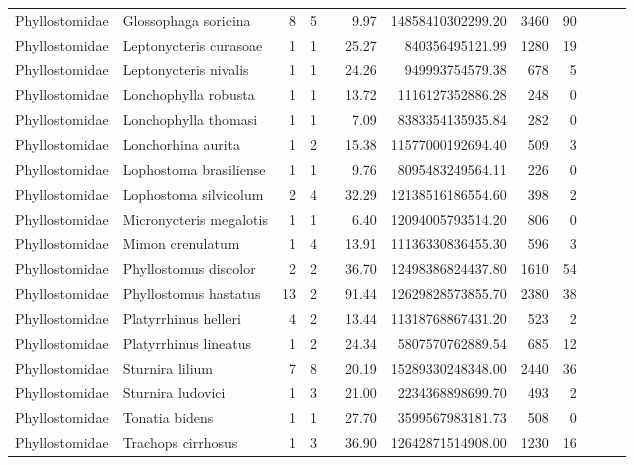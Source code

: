 \begin{landscape}
\begin{longtable}{@{}llrrrrrrrrrr@{}}
  Phyllostomidae & Glossophaga soricina &   8 &   5 &  & 9.97 & 14858410302299.20 & 3460 &  90 &  &  &  \\ 
  Phyllostomidae & Leptonycteris curasoae &   1 &   1 &  & 25.27 & 840356495121.99 & 1280 &  19 &  &  &  \\ 
  Phyllostomidae & Leptonycteris nivalis &   1 &   1 &  & 24.26 & 949993754579.38 & 678 &   5 &  &  &  \\ 
  Phyllostomidae & Lonchophylla robusta &   1 &   1 &  & 13.72 & 1116127352886.28 & 248 &   0 &  &  &  \\ 
  Phyllostomidae & Lonchophylla thomasi &   1 &   1 &  & 7.09 & 8383354135935.84 & 282 &   0 &  &  &  \\ 
  Phyllostomidae & Lonchorhina aurita &   1 &   2 &  & 15.38 & 11577000192694.40 & 509 &   3 &  &  &  \\ 
  Phyllostomidae & Lophostoma brasiliense &   1 &   1 &  & 9.76 & 8095483249564.11 & 226 &   0 &  &  &  \\ 
  Phyllostomidae & Lophostoma silvicolum &   2 &   4 &  & 32.29 & 12138516186554.60 & 398 &   2 &  &  &  \\ 
  Phyllostomidae & Micronycteris megalotis &   1 &   1 &  & 6.40 & 12094005793514.20 & 806 &   0 &  &  &  \\ 
  Phyllostomidae & Mimon crenulatum &   1 &   4 &  & 13.91 & 11136330836455.30 & 596 &   3 &  &  &  \\ 
  Phyllostomidae & Phyllostomus discolor &   2 &   2 &  & 36.70 & 12498386824437.80 & 1610 &  54 &  &  &  \\ 
  Phyllostomidae & Phyllostomus hastatus &  13 &   2 &  & 91.44 & 12629828573855.70 & 2380 &  38 &  &  &  \\ 
  Phyllostomidae & Platyrrhinus helleri &   4 &   2 &  & 13.44 & 11318768867431.20 & 523 &   2 &  &  &  \\ 
  Phyllostomidae & Platyrrhinus lineatus &   1 &   2 &  & 24.34 & 5807570762889.54 & 685 &  12 &  &  &  \\ 
  Phyllostomidae & Sturnira lilium &   7 &   8 &  & 20.19 & 15289330248348.00 & 2440 &  36 &  &  &  \\ 
  Phyllostomidae & Sturnira ludovici &   1 &   3 &  & 21.00 & 2234368898699.70 & 493 &   2 &  &  &  \\ 
  Phyllostomidae & Tonatia bidens &   1 &   1 &  & 27.70 & 3599567983181.73 & 508 &   0 &  &  &  \\ 
  Phyllostomidae & Trachops cirrhosus &   1 &   3 &  & 36.90 & 12642871514908.00 & 1230 &  16 &  &  &  \\ 

\end{longtable}
\end{landscape}
